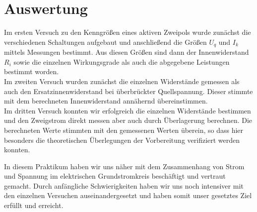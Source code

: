 \section{Auswertung}

Im ersten Versuch zu den Kenngrößen eines aktiven Zweipols wurde zunächst die verschiedenen Schaltungen aufgebaut und
anschließend die Größen $U_q$ und $I_k$ mittels Messungen bestimmt. Aus diesen
Größen sind dann der Innenwiderstand $R_i$ sowie die einzelnen Wirkungsgrade als auch die
abgegebene Leistungen bestimmt worden.\\
Im zweiten Versuch wurden zunächst die einzelnen Widerstände gemessen als auch den
Ersatzinnenwiderstand bei überbrückter Quellspannung. Dieser stimmte mit dem
berechneten Innenwiderstand annähernd übereinstimmen.\\
Im dritten Versuch konnten wir erfolgreich die einzelnen Widerstände bestimmen und den Zweigstrom direkt messen aber auch durch Überlagerung berechnen. Die berechneten Werte stimmten mit den gemessenen Werten überein, so dass hier besonders die theoretischen Überlegungen der Vorbereitung verifiziert werden konnten.

In diesem Praktikum haben wir uns näher mit dem Zusammenhang von Strom und Spannung im
elektrischen Grundstromkreis beschäftigt und vertraut gemacht. Durch anfängliche Schwierigkeiten
haben wir uns noch intensiver mit den einzelnen Versuchen auseinandergesetzt und haben somit
unser gesetztes Ziel erfüllt und erreicht.